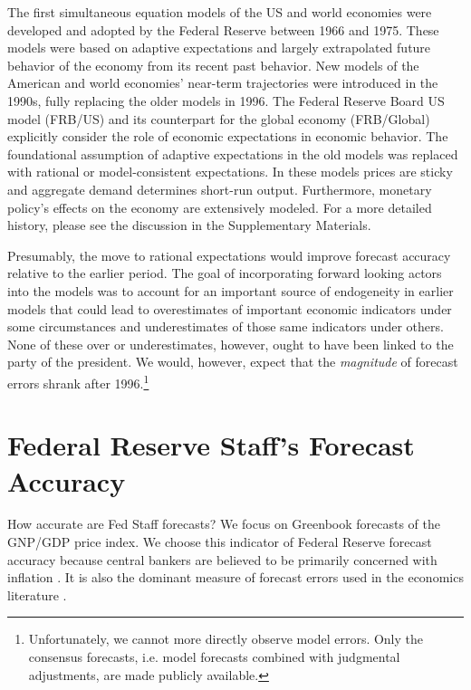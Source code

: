 \documentclass[a4paper]{article}
\begin{document}
The first simultaneous equation models of the US and world economies were developed and adopted by the Federal Reserve between 1966 and 1975. These models were based on adaptive expectations and largely extrapolated future behavior of the economy from its recent past behavior. New models of the American and world economies' near-term trajectories were introduced in the 1990s, fully replacing the older models in 1996. The Federal Reserve Board US model (FRB/US) and its counterpart for the global economy (FRB/Global) explicitly consider the role of economic expectations in economic behavior. The foundational assumption of adaptive expectations in the old models was replaced with rational or model-consistent expectations. In these models prices are sticky and aggregate demand determines short-run output. Furthermore, monetary policy's effects on the economy are extensively modeled. For a more detailed history, please see the discussion in the Supplementary Materials.

Presumably, the move to rational expectations would improve forecast accuracy relative to the earlier period. The goal of incorporating forward looking actors into the models was to account for an important source of endogeneity in earlier models that could lead to overestimates of important economic indicators under some circumstances and underestimates of those same indicators under others. None of these over or underestimates, however, ought to have been linked to the party of the president. We would, however, expect that the \emph{magnitude} of forecast errors shrank after 1996.\footnote{Unfortunately, we cannot more directly observe model errors. Only the consensus forecasts, i.e. model forecasts combined with judgmental adjustments, are made publicly available.}



\section{Federal Reserve Staff's Forecast Accuracy}\label{ForecastAcc}

How accurate are Fed Staff forecasts? We focus on Greenbook forecasts of the GNP/GDP price index. We choose this indicator of Federal Reserve forecast accuracy because central bankers are believed to be primarily concerned with inflation \citep[e.g.][]{Cukierman1992,Mukherjee2008,Tillmann2008}. It is also the dominant measure of forecast errors used in the economics literature \citep[c.f.][]{Romer2000}.
\end{document}
